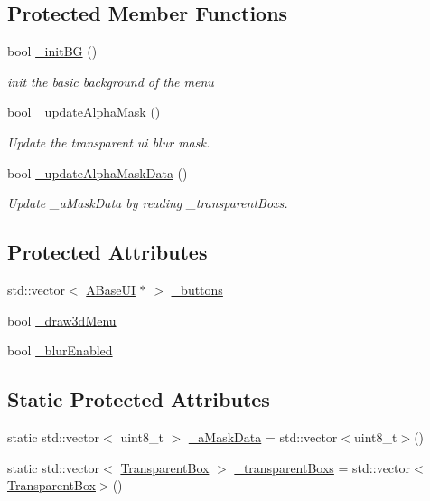 \subsection*{Protected Member Functions}
\begin{DoxyCompactItemize}
\item 
bool \hyperlink{class_a_scene_menu_aa54bec80fcc36b1607eeb1bb80ab0142}{\+\_\+init\+BG} ()
\begin{DoxyCompactList}\small\item\em init the basic background of the menu \end{DoxyCompactList}\item 
bool \hyperlink{class_a_scene_menu_a0dd22da4b527200c78ea2d4a07678840}{\+\_\+update\+Alpha\+Mask} ()
\begin{DoxyCompactList}\small\item\em Update the transparent ui blur mask. \end{DoxyCompactList}\item 
bool \hyperlink{class_a_scene_menu_ad1329cc6ba1992e44b80279a03a11ea9}{\+\_\+update\+Alpha\+Mask\+Data} ()
\begin{DoxyCompactList}\small\item\em Update \+\_\+a\+Mask\+Data by reading \+\_\+transparent\+Boxs. \end{DoxyCompactList}\end{DoxyCompactItemize}
\subsection*{Protected Attributes}
\begin{DoxyCompactItemize}
\item 
std\+::vector$<$ \hyperlink{class_a_base_u_i}{A\+Base\+UI} $\ast$ $>$ \hyperlink{class_a_scene_menu_ae18fa3a41aef71fd11a3166221b69024}{\+\_\+buttons}
\item 
bool \hyperlink{class_a_scene_menu_a10b81e94fdaeb7d466279db7c184d8f9}{\+\_\+draw3d\+Menu}
\item 
bool \hyperlink{class_a_scene_menu_ad7e81a98550d9756defeec59936615bd}{\+\_\+blur\+Enabled}
\end{DoxyCompactItemize}
\subsection*{Static Protected Attributes}
\begin{DoxyCompactItemize}
\item 
static std\+::vector$<$ uint8\+\_\+t $>$ \hyperlink{class_a_scene_menu_add676821713fff2c6117e72bd6f9fdd3}{\+\_\+a\+Mask\+Data} = std\+::vector$<$uint8\+\_\+t$>$()
\item 
static std\+::vector$<$ \hyperlink{struct_transparent_box}{Transparent\+Box} $>$ \hyperlink{class_a_scene_menu_a1ffe04b2d54c01c3bbcc7a15ea14d901}{\+\_\+transparent\+Boxs} = std\+::vector$<$\hyperlink{struct_transparent_box}{Transparent\+Box}$>$()
\end{DoxyCompactItemize}
